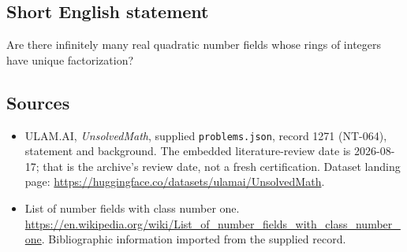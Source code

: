 \documentclass[11pt,a4paper]{article}
\begin{document}
\subsection{Short English statement}

Are there infinitely many real quadratic number fields whose rings of integers have unique factorization?

\subsection{Sources}

{\small

\begin{itemize}

\item[\hypertarget{source:1271:1}{S1}] ULAM.AI, \emph{UnsolvedMath}, supplied \texttt{problems.json}, record 1271 (NT-064), statement and background. The embedded literature-review date is 2026-08-17; that is the archive’s review date, not a fresh certification. Dataset landing page: \url{https://huggingface.co/datasets/ulamai/UnsolvedMath}.

\item[\hypertarget{source:1271:2}{S2}] List of number fields with class number one. \url{https://en.wikipedia.org/wiki/List_of_number_fields_with_class_number_one}. Bibliographic information imported from the supplied record.

\end{itemize}

}

\label{end:1271}
\end{document}
